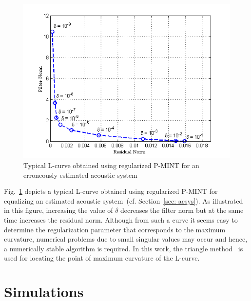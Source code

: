 \documentclass[10pt]{IEEEtran}
\begin{document}
\begin{figure}[t]
\centering
\includegraphics[scale = 0.65]{Plots/lcurve_ex}
\caption{Typical L-curve obtained using regularized P-MINT for an erroneously estimated acoustic system}
\label{fig: lcurveex}
\end{figure}
Fig.~\ref{fig: lcurveex} depicts a typical L-curve obtained using regularized P-MINT for equalizing an estimated acoustic system~(cf. Section~\ref{sec: acsys}).
As illustrated in this figure, increasing the value of $\delta$ decreases the filter norm but at the same time increases the residual norm.
Although from such a curve it seems easy to determine the regularization parameter that corresponds to the maximum curvature, numerical problems due to small singular values may occur and hence, a numerically stable algorithm is required.
In this work, the triangle method~\cite{Castellanos_2002} is used for locating the point of maximum curvature of the L-curve.

\section{Simulations}
\label{sec: exp}
\end{document}

